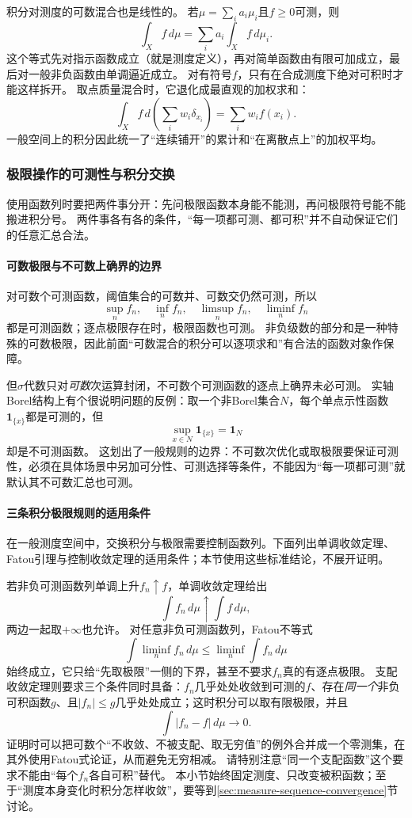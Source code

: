 积分对测度的可数混合也是线性的。
若$\mu=\sum_i a_i\mu_i$且$f\geq0$可测，则
\[
 \int_X f\,d\mu=\sum_i a_i\int_X f\,d\mu_i.
\]
这个等式先对指示函数成立（就是测度定义），再对简单函数由有限可加成立，最后对一般非负函数由单调逼近成立。
对有符号$f$，只有在合成测度下绝对可积时才能这样拆开。
取点质量混合时，它退化成最直观的加权求和：
\[
 \int_X f\,d\!\left(\sum_i w_i\delta_{x_i}\right)=\sum_i w_i f(x_i).
\]
一般空间上的积分因此统一了“连续铺开”的累计和“在离散点上”的加权平均。

\subsubsection{极限操作的可测性与积分交换}

使用函数列时要把两件事分开：先问极限函数本身能不能测，再问极限符号能不能搬进积分号。
两件事各有各的条件，“每一项都可测、都可积”并不自动保证它们的任意汇总合法。

\paragraph{可数极限与不可数上确界的边界}

对可数个可测函数，阈值集合的可数并、可数交仍然可测，所以
\[
 \sup_n f_n,\quad\inf_n f_n,\quad\limsup_n f_n,\quad\liminf_n f_n
\]
都是可测函数；逐点极限存在时，极限函数也可测。
非负级数的部分和是一种特殊的可数极限，因此前面“可数混合的积分可以逐项求和”有合法的函数对象作保障。

但$\sigma$代数只对\emph{可数}次运算封闭，不可数个可测函数的逐点上确界未必可测。
实轴Borel结构上有个很说明问题的反例：取一个非Borel集合$N$，每个单点示性函数$\mathbf 1_{\{x\}}$都是可测的，但
\[
 \sup_{x\in N}\mathbf 1_{\{x\}}=\mathbf 1_N
\]
却是不可测函数。
这划出了一般规则的边界：不可数次优化或取极限要保证可测性，必须在具体场景中另加可分性、可测选择等条件，不能因为“每一项都可测”就默认其不可数汇总也可测。

\paragraph{三条积分极限规则的适用条件}

在一般测度空间中，交换积分与极限需要控制函数列。下面列出单调收敛定理、Fatou引理与控制收敛定理的适用条件；本节使用这些标准结论，不展开证明。

若非负可测函数列单调上升$f_n\uparrow f$，单调收敛定理给出
\[
 \int f_n\,d\mu\uparrow\int f\,d\mu,
\]
两边一起取$+\infty$也允许。
对任意非负可测函数列，Fatou不等式
\[
 \int\liminf_n f_n\,d\mu\leq\liminf_n\int f_n\,d\mu
\]
始终成立，它只给“先取极限”一侧的下界，甚至不要求$f_n$真的有逐点极限。
支配收敛定理则要求三个条件同时具备：$f_n$几乎处处收敛到可测的$f$、存在\emph{同一个}非负可积函数$g$、且$|f_n|\leq g$几乎处处成立；这时积分可以取有限极限，并且
\[
 \int|f_n-f|\,d\mu\to0.
\]
证明时可以把可数个“不收敛、不被支配、取无穷值”的例外合并成一个零测集，在其外使用Fatou式论证，从而避免无穷相减。
请特别注意“同一个支配函数”这个要求不能由“每个$f_n$各自可积”替代。
本小节始终固定测度、只改变被积函数；至于“测度本身变化时积分怎样收敛”，要等到\ref{sec:measure-sequence-convergence}节讨论。

